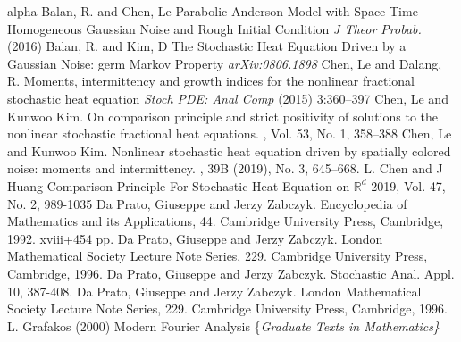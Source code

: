 \documentclass{article}
\numberwithin{equation}{section}
\newcommand{\R}{\mathbb{R}}
\begin{document}
\begin{small}%
	\begin{thebibliography}{alpha}
		Balan, R. and Chen, Le
		\newblock Parabolic Anderson Model with Space-Time Homogeneous Gaussian Noise and Rough Initial Condition
		\newblock \textit{J Theor Probab.} (2016)
		Balan, R. and Kim, D
		\newblock The Stochastic Heat Equation Driven by a Gaussian Noise: germ Markov Property
		\newblock \textit{arXiv:0806.1898}
		Chen, Le and Dalang, R.
		\newblock Moments, intermittency and growth indices for the
		nonlinear fractional stochastic heat equation
		\newblock \textit{Stoch PDE: Anal Comp} (2015) 3:360–397
		Chen, Le and Kunwoo Kim.
		\newblock On comparison principle and strict positivity of solutions to the
		nonlinear stochastic fractional heat equations.
		,  Vol. 53, No. 1, 358–388
		Chen, Le and Kunwoo Kim.
		\newblock Nonlinear stochastic heat equation driven by spatially colored noise: moments and intermittency.
		, 39B (2019), No. 3, 645--668.
		L. Chen and J Huang
		\newblock Comparison Principle For Stochastic Heat Equation on $\R^d$
		 2019, Vol. 47, No. 2, 989-1035
		Da Prato, Giuseppe and Jerzy Zabczyk.
		Encyclopedia of Mathematics and its Applications, 44. Cambridge University Press, Cambridge, 1992. xviii+454 pp.
		Da Prato, Giuseppe and Jerzy Zabczyk.
		\newblock London Mathematical Society Lecture Note Series, 229. Cambridge University Press, Cambridge, 1996.
		Da Prato, Giuseppe and Jerzy Zabczyk.
		Stochastic Anal. Appl. 10, 387-408.
		Da Prato, Giuseppe and Jerzy Zabczyk.
		\newblock London Mathematical Society Lecture Note Series, 229. Cambridge University Press, Cambridge, 1996.
		L. Grafakos (2000)
		\newblock Modern Fourier Analysis
		\newblock \{\it Graduate Texts in Mathematics\}

\end{thebibliography}
\end{small}
\end{document}
